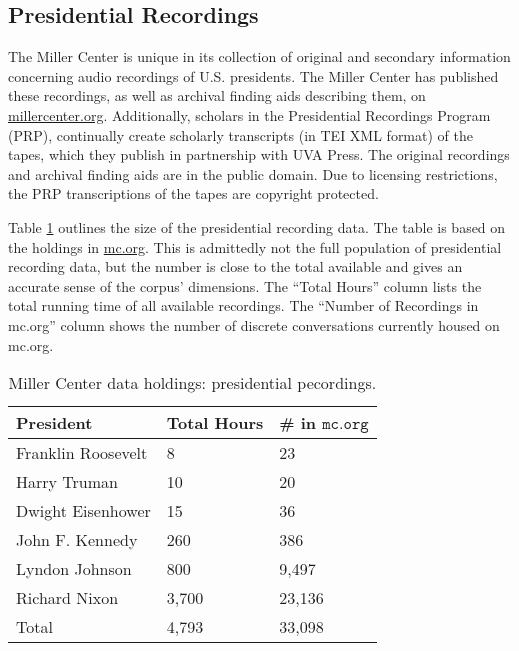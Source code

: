 \documentclass[12pt, oneside]{article}   	%
\begin{document}
\subsection{Presidential Recordings}\label{section.data.prp}
The Miller Center is unique in its collection of original and secondary information concerning audio recordings of U.S. presidents.  The Miller Center has published these recordings, as well as archival finding aids describing them, on \href{https://millercenter.org}{millercenter.org}.  Additionally, scholars in the Presidential Recordings Program (PRP), continually create scholarly transcripts (in TEI XML format) of the tapes, which they publish in partnership with UVA Press.   The original recordings and archival finding aids are in the public domain.  Due to licensing restrictions, the PRP transcriptions of the tapes are copyright protected.   

Table \ref{table.data.prp} outlines the size of the presidential recording data.  The table is based on the holdings in \href{https://millercenter.org}{mc.org}.  This is admittedly not the full population of presidential recording data, but the number is close to the total available and gives an accurate sense of the corpus’ dimensions.  The ``Total Hours'' column lists the total running time of all available recordings.  The ``Number of Recordings in mc.org'' column shows the number of discrete conversations currently housed on mc.org.  

\begin{table}[htp]
\caption{Miller Center data holdings: presidential pecordings.}
\begin{center}
\begin{tabular}{ p{2in} l l }
\toprule
President				&	Total Hours		&	\#  in $\mathtt{mc.org}$	\\
\midrule
 Franklin Roosevelt 		& 	8 				& 	23 \\ 
 \midrule 
 Harry Truman 			& 	10 				& 	20 \\  
 \midrule
 Dwight Eisenhower	 	& 	15 				& 	36   \\
 \midrule
 John F. Kennedy	 	& 	260 				& 	386   \\
 \hline
 Lyndon Johnson	 	& 	800 				& 	9,497   \\
 \midrule
 Richard Nixon		 	& 	3,700			& 	23,136   \\
\bottomrule
Total					&	4,793			&	33,098	\\
\bottomrule
\end{tabular}
\end{center}
\label{table.data.prp}
\end{table}%
\end{document}

